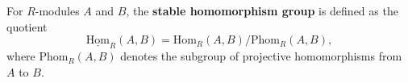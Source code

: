 For $R$-modules $A$ and $B$, the \textbf{stable homomorphism group} is defined as the quotient
$$
\underline{\mathrm{Hom}}_R(A, B) = \mathrm{Hom}_R(A, B) / \mathrm{Phom}_R(A, B),
$$
where $\mathrm{Phom}_R(A, B)$ denotes the subgroup of projective homomorphisms from $A$ to $B$.
